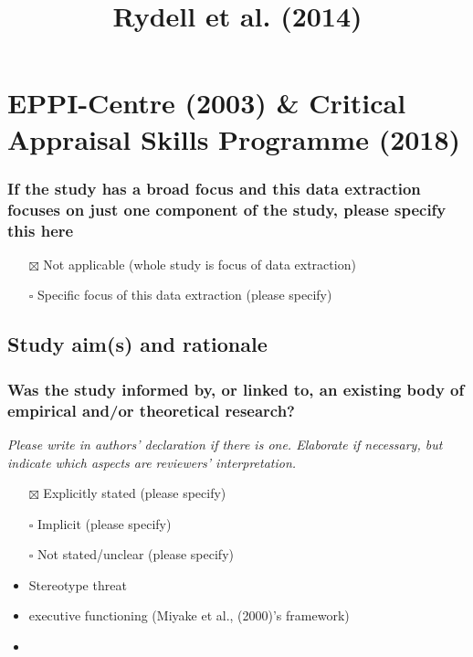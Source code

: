 \documentclass[
  doc, a4paper]{apa7}
\title{Rydell et al. (2014)}
\author{\phantom{0}}
\date{}
\affiliation{\phantom{0}}
\providecommand{\tightlist}{%
  \setlength{\itemsep}{0pt}\setlength{\parskip}{0pt}}
\begin{document}
\maketitle

\section{EPPI-Centre (2003) \& Critical Appraisal Skills Programme (2018)}\label{eppi-centrereviewguidelinesextracting2003-criticalappraisalskillsprogrammecaspsystematicreview2018}

\subsubsection{If the study has a broad focus and this data extraction focuses on just one component of the study, please specify this here}\label{if-the-study-has-a-broad-focus-and-this-data-extraction-focuses-on-just-one-component-of-the-study-please-specify-this-here}

\begin{itemize}
\tightlist
\item[$\boxtimes$]
  Not applicable (whole study is focus of data extraction)\\
\item[$\square$]
  Specific focus of this data extraction (please specify)
\end{itemize}

\subsection{Study aim(s) and rationale}\label{study-aims-and-rationale}

\subsubsection{Was the study informed by, or linked to, an existing body of empirical and/or theoretical research?}\label{was-the-study-informed-by-or-linked-to-an-existing-body-of-empirical-andor-theoretical-research}

\emph{Please write in authors' declaration if there is one. Elaborate if necessary, but indicate which aspects are reviewers' interpretation.}

\begin{itemize}
\item[$\boxtimes$]
  Explicitly stated (please specify)\\
\item[$\square$]
  Implicit (please specify)\\
\item[$\square$]
  Not stated/unclear (please specify)
\item
  Stereotype threat
\item
  executive functioning (Miyake et al., (2000)'s framework)
\item
\end{itemize}
\end{document}
